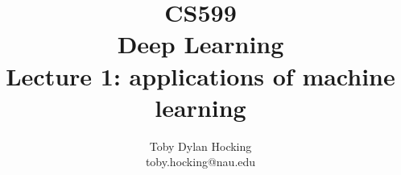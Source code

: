 \documentclass{beamer}
\begin{document}
\title{CS599\\Deep Learning
\\Lecture 1: applications of machine learning}
\author{
  Toby Dylan Hocking\\
  toby.hocking@nau.edu
}


\maketitle


\end{document}
